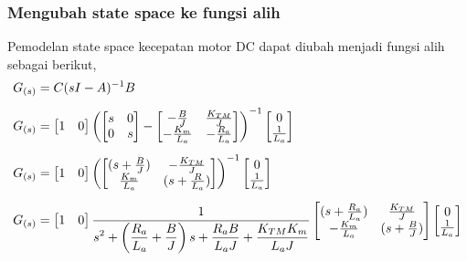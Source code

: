 \documentclass[../main.tex]{subfiles}
\begin{document}
            \subsubsection{Mengubah state space ke fungsi alih}
                Pemodelan state space kecepatan motor DC dapat diubah menjadi fungsi alih sebagai berikut,
                \begin{equation}
                    \begin{split}
                        G_{(s)} &= C(sI - A)^{-1}B \\[5pt]
                        G_{(s)} &= \begin{bmatrix} 1 & 0 \end{bmatrix}\left( \begin{bmatrix} s & 0 \\ 0 & s \end{bmatrix} - \begin{bmatrix} -\frac{B}{J} & \frac{K_{TM}}{J} \\ -\frac{K_m}{L_a} & -\frac{R_a}{L_a} \end{bmatrix} \right)^{-1} \begin{bmatrix} 0 \\ \frac{1}{L_a}  \end{bmatrix}\\[5pt]
                        G_{(s)} &= \begin{bmatrix} 1 & 0 \end{bmatrix} \left( \begin{bmatrix} (s+\frac{B}{J}) & -\frac{K_{TM}}{J} \\ \frac{K_m}{L_a} & (s+\frac{R}{L_a}) \end{bmatrix} \right)^{-1} \begin{bmatrix} 0 \\ \frac{1}{L_a} \end{bmatrix} \\[5pt]
                        G_{(s)} &= \begin{bmatrix} 1 & 0 \end{bmatrix} \ffrac{1}{s^2 + \left( \frac{R_a}{L_a} + \frac{B}{J} \right)s + \frac{R_a B}{L_a J} + \frac{K_{TM} K_m}{L_a J}} \begin{bmatrix} (s + \frac{R_a}{L_a}) & \frac{K_{TM}}{J} \\ -\frac{K_m}{L_a} & (s + \frac{B}{J}) \end{bmatrix} \begin{bmatrix} 0 \\ \frac{1}{L_a} \end{bmatrix} \\[5pt]

\end{split}
\end{equation}
\end{document}
